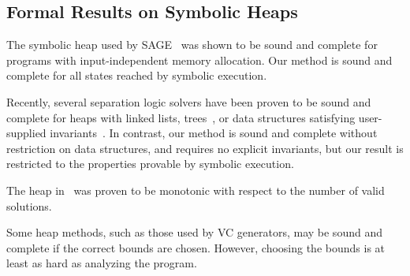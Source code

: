 \subsection{Formal Results on Symbolic Heaps}
The symbolic heap used by SAGE~\cite{Elkarablieh:2009} was shown to be sound and complete for programs with input-independent memory allocation. Our method is sound and complete for all states reached by symbolic execution. 

Recently, several separation logic solvers have been proven to be sound and complete for heaps with linked lists, trees~\cite{Piskac:2014}, or data structures satisfying user-supplied invariants~\cite{Brotherston:2014}. In contrast, our method is sound and complete without restriction on data structures, and requires no explicit invariants, but our result is restricted to the properties provable by symbolic execution. 

The heap in~\cite{Dillig:2011} was proven to be monotonic with respect to the number of valid solutions. 

Some heap methods, such as those used by VC generators, may be sound and complete if the correct bounds are chosen. However, choosing the bounds is at least as hard as analyzing the program. 






%
%
%

%
%
%
%
%
